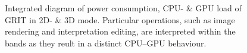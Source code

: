 \documentclass[review]{elsarticle}
\begin{document}
\begin{figure}[htbp!]
\begin{center}
	 	\begin{minipage}{\columnwidth}
	 		\centering
	 	\end{minipage}
	 	\begin{minipage}{\columnwidth}
	 		\centering
	 	\end{minipage}
	\caption{Integrated diagram of power consumption, CPU- \& GPU load of GRIT in 2D- \& 3D mode. Particular operations, such as image rendering and interpretation editing, are interpreted within the bands as they reult in a distinct \gls{CPU}--\gls{GPU} behaviour.}
	\label{fig:power:Power_CPU_GPU}
\end{center}
\end{figure}
\end{document}
